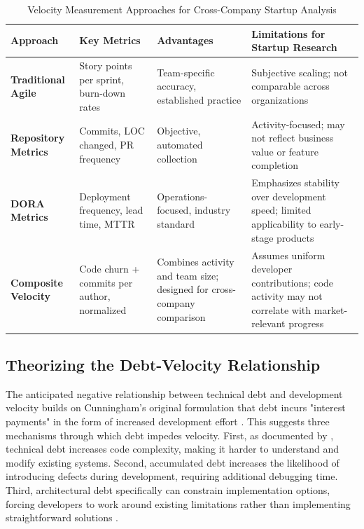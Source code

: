 \begin{table}[htbp]
\centering
\caption{Velocity Measurement Approaches for Cross-Company Startup Analysis}
\label{tab:velocity_comparison}
\begin{tabular}{|p{2.8cm}|p{3.0cm}|p{3.8cm}|p{4.5cm}|}
\hline
\textbf{Approach} & \textbf{Key Metrics} & \textbf{Advantages} & \textbf{Limitations for Startup Research} \\
\hline
\textbf{Traditional Agile} & 
Story points per sprint, burn-down rates & 
Team-specific accuracy, established practice & 
Subjective scaling; not comparable across organizations \\
\hline
\textbf{Repository Metrics} & 
Commits, LOC changed, PR frequency & 
Objective, automated collection & 
Activity-focused; may not reflect business value or feature completion \\
\hline
\textbf{DORA Metrics} & 
Deployment frequency, lead time, MTTR & 
Operations-focused, industry standard & 
Emphasizes stability over development speed; limited applicability to early-stage products \\
\hline
\textbf{Composite Velocity} & 
Code churn + commits per author, normalized & 
Combines activity and team size; designed for cross-company comparison & 
Assumes uniform developer contributions; code activity may not correlate with market-relevant progress \\
\hline
\end{tabular}
\end{table}

\subsection{Theorizing the Debt-Velocity Relationship}

The anticipated negative relationship between technical debt and development velocity builds on Cunningham's original formulation that debt incurs "interest payments" in the form of increased development effort \citep{cunningham1992wycash}. This suggests three mechanisms through which debt impedes velocity. First, as documented by \citet{li2015systematic}, technical debt increases code complexity, making it harder to understand and modify existing systems. Second, accumulated debt increases the likelihood of introducing defects during development, requiring additional debugging time. Third, architectural debt specifically can constrain implementation options, forcing developers to work around existing limitations rather than implementing straightforward solutions \citep{morgenthaler2012searching}.

